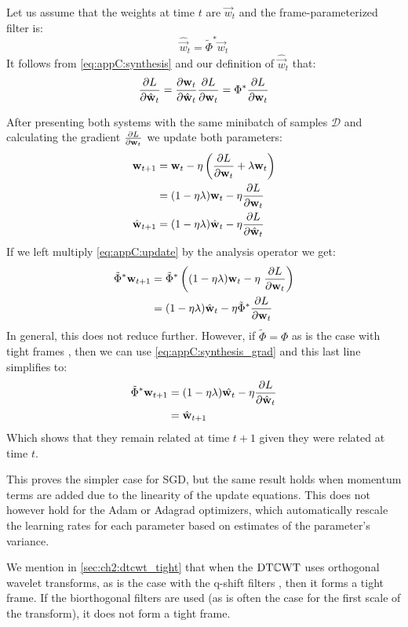 Let us assume that the weights at time $t$ are $\vec{w}_t$ and the frame-parameterized
filter is:
\begin{equation}
  \hat{\vec{w}}_t = \tilde{\Phi}^* \vec{w}_t \label{eq:appC:initial_condition}
 \end{equation}
 It follows from \eqref{eq:appC:synthesis} and our definition of
 $\hat{\vec{w}}_t$ that:
\begin{equation}
  \frac{\partial L}{\partial \hat{\mathbf{w}}_t} =\frac{\partial \mathbf{w}_t}{\partial \hat{\mathbf{w}}_t} \frac{\partial L}{\partial \mathbf{w}_t} =  {\Phi}^* \frac{\partial L}{\partial \mathbf{w}_t} \label{eq:appC:synthesis_grad}
\end{equation}

After presenting both systems with the same minibatch of samples $\mathcal{D}$
and calculating the gradient $\frac{\partial L}{\partial \mathbf{w}_t}$ we update both parameters:
\begin{align}
  \mathbf{w}_{t+1} & =  \mathbf{w}_t - \eta \left( \frac{\partial L}{\partial \mathbf{w}_t} + \lambda \mathbf{w}_t \right) \\
                &= (1-\eta\lambda)\mathbf{w}_t - \eta \frac{\partial L}{\partial \mathbf{w}_t} \label{eq:appC:update} \\
  \hat{\mathbf{w}}_{t+1} & = (1-\eta\lambda)\hat{\mathbf{w}}_t - \eta \frac{\partial L}{\partial \hat{\mathbf{w}}_t} 
\end{align}
If we left multiply \eqref{eq:appC:update} by the analysis operator we get:
\begin{align}
  \tilde{\Phi}^* \mathbf{w}_{t+1} &= \tilde{\Phi}^* \left( (1-\eta\lambda){\mathbf{w}}_t - \eta\ \frac{\partial L}{\partial {\mathbf{w}}_t}\right) \\       
                               & =  (1-\eta\lambda)\hat{\mathbf{w}}_t - \eta \tilde{\Phi}^* \frac{\partial L}{\partial {\mathbf{w}}_t} 
\end{align}
In general, this does not reduce further. However, if $\tilde{\Phi} =
{\Phi}$ as is the case with tight frames \cite{kovacevic_introduction_2008},
then we can use \eqref{eq:appC:synthesis_grad} and this last line simplifies to:
\begin{align}
  \tilde{\Phi}^* \mathbf{w}_{t+1} &= (1-\eta\lambda)\hat{\mathbf{w}_t} - \eta \frac{\partial L}{\partial \hat{\mathbf{w}}_t} \\
                               &= \hat{\mathbf{w}}_{t+1}
\end{align}
Which shows that they remain related at time $t+1$ given they were
related at time $t$.

This proves the simpler case for SGD, but the same result holds when
momentum terms are added due to the linearity of the update equations. This does
not however hold for the Adam \cite{kingma_adam:_2014} or Adagrad
\cite{duchi_adaptive_2011} optimizers, which automatically rescale the learning
rates for each parameter based on estimates of the parameter's variance.

We mention in \autoref{sec:ch2:dtcwt_tight} that when the $\mathrm{DT}\mathbb{C}\mathrm{WT}$ uses orthogonal
wavelet transforms, as is the case with the q-shift filters \cite{kingsbury_dual-tree_2000}, then it
forms a tight frame. If the biorthogonal filters are used (as is often the case
for the first scale of the transform), it does not form a tight frame.
